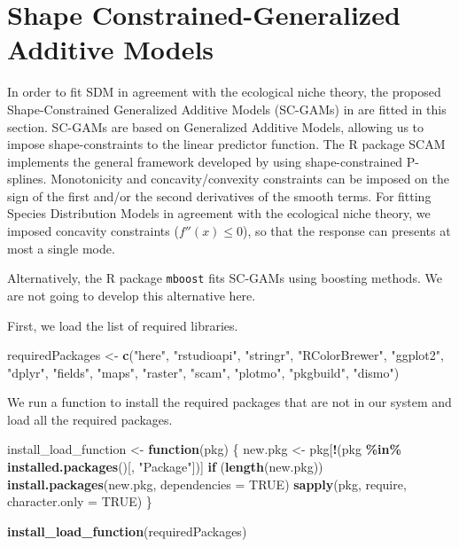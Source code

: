 \documentclass[
]{book}
\newenvironment{Shaded}{\begin{snugshade}}{\end{snugshade}}
\newcommand{\AttributeTok}[1]{\textcolor[rgb]{0.13,0.29,0.53}{#1}}
\newcommand{\ConstantTok}[1]{\textcolor[rgb]{0.56,0.35,0.01}{#1}}
\newcommand{\ControlFlowTok}[1]{\textcolor[rgb]{0.13,0.29,0.53}{\textbf{#1}}}
\newcommand{\FunctionTok}[1]{\textcolor[rgb]{0.13,0.29,0.53}{\textbf{#1}}}
\newcommand{\NormalTok}[1]{#1}
\newcommand{\OtherTok}[1]{\textcolor[rgb]{0.56,0.35,0.01}{#1}}
\newcommand{\SpecialCharTok}[1]{\textcolor[rgb]{0.81,0.36,0.00}{\textbf{#1}}}
\newcommand{\StringTok}[1]{\textcolor[rgb]{0.31,0.60,0.02}{#1}}
\begin{document}
\chapter{Shape Constrained-Generalized Additive Models}\label{shape-constrained-generalized-additive-models}

In order to fit SDM in agreement with the ecological niche theory, the proposed Shape-Constrained Generalized Additive Models (SC-GAMs) in \citep{citores_etal_2020} are fitted in this section. SC-GAMs are based on Generalized Additive Models, allowing us to impose shape-constraints to the linear predictor function. The R package SCAM implements the general framework developed by \citep{pya_etal_2015} using shape-constrained P-splines. Monotonicity and concavity/convexity constraints can be imposed on the sign of the first and/or the second derivatives of the smooth terms. For fitting Species Distribution Models in agreement with the ecological niche theory, we imposed concavity constraints (\(f''(x) \le 0\)), so that the response can presents at most a single mode.

Alternatively, the R package \texttt{mboost} fits SC-GAMs using boosting methods. We are not going to develop this alternative here.

First, we load the list of required libraries.

\begin{Shaded}
\begin{Highlighting}[]
\NormalTok{requiredPackages }\OtherTok{\textless{}{-}} \FunctionTok{c}\NormalTok{(}\StringTok{"here"}\NormalTok{, }\StringTok{"rstudioapi"}\NormalTok{,}
    \StringTok{"stringr"}\NormalTok{, }\StringTok{"RColorBrewer"}\NormalTok{, }\StringTok{"ggplot2"}\NormalTok{,}
    \StringTok{"dplyr"}\NormalTok{, }\StringTok{"fields"}\NormalTok{, }\StringTok{"maps"}\NormalTok{, }\StringTok{"raster"}\NormalTok{,}
    \StringTok{"scam"}\NormalTok{, }\StringTok{"plotmo"}\NormalTok{, }\StringTok{"pkgbuild"}\NormalTok{, }\StringTok{"dismo"}\NormalTok{)}
\end{Highlighting}
\end{Shaded}

We run a function to install the required packages that are not in our system and load all the required packages.

\begin{Shaded}
\begin{Highlighting}[]
\NormalTok{install\_load\_function }\OtherTok{\textless{}{-}} \ControlFlowTok{function}\NormalTok{(pkg) \{}
\NormalTok{    new.pkg }\OtherTok{\textless{}{-}}\NormalTok{ pkg[}\SpecialCharTok{!}\NormalTok{(pkg }\SpecialCharTok{\%in\%} \FunctionTok{installed.packages}\NormalTok{()[,}
        \StringTok{"Package"}\NormalTok{])]}
    \ControlFlowTok{if}\NormalTok{ (}\FunctionTok{length}\NormalTok{(new.pkg))}
        \FunctionTok{install.packages}\NormalTok{(new.pkg, }\AttributeTok{dependencies =} \ConstantTok{TRUE}\NormalTok{)}
    \FunctionTok{sapply}\NormalTok{(pkg, require, }\AttributeTok{character.only =} \ConstantTok{TRUE}\NormalTok{)}
\NormalTok{\}}

\FunctionTok{install\_load\_function}\NormalTok{(requiredPackages)}
\end{Highlighting}
\end{Shaded}
\end{document}
